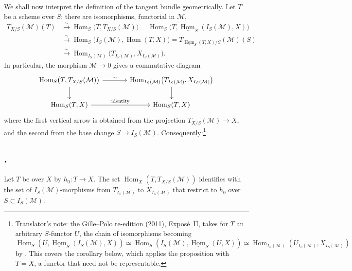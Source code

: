 We shall now interpret the definition of the tangent bundle
geometrically. Let \(T\) be a scheme over \(S\); there are isomorphisms,
functorial in \(\mathcal M\),
\[
\begin{aligned}
  T_{X/S}(\mathcal M)(T)
  &\xrightarrow{\sim}\operatorname{Hom}_S\bigl(T,T_{X/S}(\mathcal M)\bigr)
   =\operatorname{Hom}_S\bigl(T,\underline{\operatorname{Hom}}_S(I_S(\mathcal M),X)\bigr)\\
  &\xrightarrow{\sim}\operatorname{Hom}_S\bigl(I_S(\mathcal M),\underline{\operatorname{Hom}}(T,X)\bigr)
   =T_{\underline{\operatorname{Hom}}_S(T,X)/S}(\mathcal M)(S)\\
  &\xrightarrow{\sim}\operatorname{Hom}_{I_S(\mathcal M)}
   \bigl(T_{I_S(\mathcal M)},X_{I_S(\mathcal M)}\bigr).
\end{aligned}
\]
In particular, the morphism \(\mathcal M\to0\) gives a commutative diagram
\[
\begin{tikzcd}[column sep=large]
  \operatorname{Hom}_S\bigl(T,T_{X/S}(\mathcal M)\bigr) \arrow[r,"\sim"] \arrow[d]
  & \operatorname{Hom}_{I_S(\mathcal M)}\bigl(T_{I_S(\mathcal M)},X_{I_S(\mathcal M)}\bigr) \arrow[d]\\
  \operatorname{Hom}_S(T,X) \arrow[r,"\text{identity}"]
  & \operatorname{Hom}_S(T,X)
\end{tikzcd}
\]
where the first vertical arrow is obtained from the projection
\(T_{X/S}(\mathcal M)\to X\), and the second from the base change
\(S\to I_S(\mathcal M)\). Consequently:\footnote{Translator's note: the
Gille--Polo re-edition (2011), Expos\'e~II, takes for \(T\) an arbitrary
\(S\)-functor \(U\), the chain of isomorphisms becoming
\(\operatorname{Hom}_S(U,\underline{\operatorname{Hom}}_S(I_S(\mathcal M),X))
\simeq\operatorname{Hom}_S(I_S(\mathcal M),\underline{\operatorname{Hom}}_S(U,X))
\simeq\operatorname{Hom}_{I_S(\mathcal M)}(U_{I_S(\mathcal M)},X_{I_S(\mathcal M)})\)
by . This covers the corollary below, which applies the
proposition with \(T=X\), a functor that need not be representable.}

\subsection*{.}
Let \(T\) be over \(X\) by \(h_0:T\to X\). The set
\(\operatorname{Hom}_X(T,T_{X/S}(\mathcal M))\) identifies with the set of
\(I_S(\mathcal M)\)-morphisms from \(T_{I_S(\mathcal M)}\) to
\(X_{I_S(\mathcal M)}\) that restrict to \(h_0\) over
\(S\subset I_S(\mathcal M)\).

